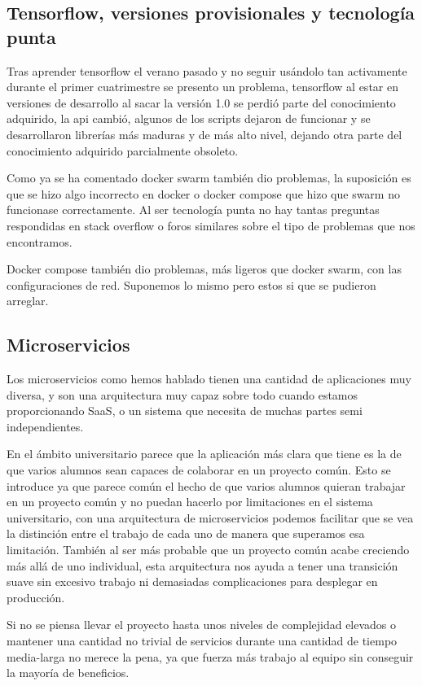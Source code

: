 \subsection{Tensorflow, versiones provisionales y tecnología punta}

Tras aprender tensorflow el verano pasado y no seguir usándolo tan activamente durante el primer cuatrimestre se presento un problema, tensorflow al estar en versiones de desarrollo al sacar la versión 1.0 se perdió parte del conocimiento adquirido, la api cambió, algunos de los scripts dejaron de funcionar y se desarrollaron librerías  más maduras y de más alto nivel, dejando otra parte del conocimiento adquirido parcialmente obsoleto.

Como ya se ha comentado docker swarm también dio problemas, la suposición es que se hizo algo incorrecto en docker o docker compose que hizo que swarm no funcionase correctamente. Al ser tecnología punta no hay tantas preguntas respondidas en stack overflow o foros similares sobre el tipo de problemas que nos encontramos.

Docker compose también dio problemas, más ligeros que docker swarm, con las configuraciones de red.
Suponemos lo mismo pero estos si que se pudieron arreglar.


\subsection{Microservicios}

Los microservicios como hemos hablado tienen una cantidad de aplicaciones muy diversa, y son una arquitectura muy capaz sobre todo cuando estamos proporcionando SaaS, o un sistema que necesita de muchas partes semi independientes. 

En el ámbito universitario parece que la aplicación más clara que tiene es la de que varios alumnos sean capaces de colaborar en un proyecto común. Esto se introduce ya que parece común el hecho de que varios alumnos quieran trabajar en un proyecto común y no puedan hacerlo por limitaciones en el sistema universitario, con una arquitectura de microservicios podemos facilitar que se vea la distinción entre el trabajo de cada uno de manera que superamos esa limitación. También al ser más probable que un proyecto común acabe creciendo más allá de uno individual, esta arquitectura nos ayuda a tener una transición suave sin excesivo trabajo ni demasiadas complicaciones para desplegar en producción.

Si no se piensa llevar el proyecto hasta unos niveles de complejidad elevados o mantener una cantidad no trivial de servicios durante una cantidad de tiempo media-larga no merece la pena, ya que fuerza más trabajo al equipo sin conseguir la mayoría de beneficios.